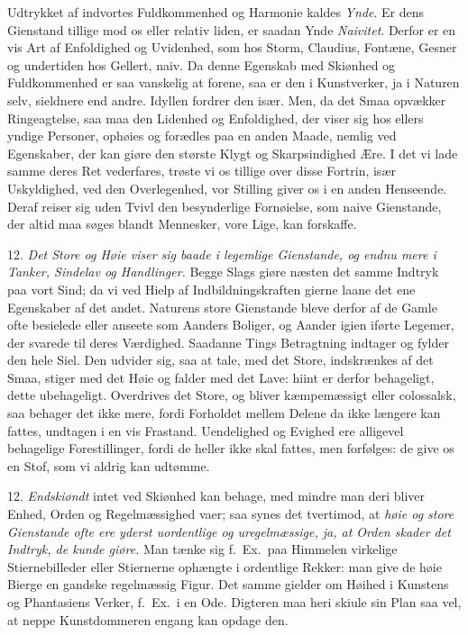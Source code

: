 \documentclass[12pt,a4paper]{article}
\newcommand{\opage}[1]{\marginnote{\footnotesize\textit{[#1]}}}
\begin{document}
Udtrykket af indvortes Fuldkommenhed og Harmonie kaldes \emph{Ynde}. Er dens Gienstand
tillige mod os eller relativ liden, er saadan Ynde \emph{Naivitet}. Derfor er en vis Art af
Enfoldighed og Uvidenhed, som hos Storm, Claudius, Fontæne, Gesner og undertiden hos
Gellert, naiv. Da denne Egenskab med Skiønhed og Fuldkommenhed er saa vanskelig at forene,
saa er den i Kunstverker, ja i Naturen selv, sieldnere end andre. Idyllen fordrer den især.
Men, da det Smaa opvækker Ringeagtelse, saa maa den Lidenhed og Enfoldighed, der viser sig
hos ellers yndige Personer, ophøies og forædles paa en anden Maade, nemlig ved Egenskaber,
der kan giøre den største Klygt og Skarpsindighed Ære. I det vi lade samme deres Ret
vederfares, trøste vi os tillige over disse Fortrin, især Uskyldighed, ved den
Overlegenhed, vor Stilling giver os i en anden Henseende. Deraf reiser sig uden Tvivl den
besynderlige Fornøielse, som naive Gienstande, der altid maa søges blandt Mennesker, vore
Lige, kan forskaffe.

12. \emph{Det Store og Høie viser sig baade i legemlige Gienstande, og endnu mere i Tanker,
Sindelav og Handlinger.} Begge Slags giøre næsten det samme Indtryk paa vort Sind; da vi
ved Hielp af Indbildningskraften gierne laane det ene Egenskaber af det
\opage{254} andet. Naturens store Gienstande bleve derfor af de Gamle ofte besielede eller anseete som
Aanders Boliger, og Aander igien iførte Legemer, der svarede til deres Værdighed. Saadanne
Tings Betragtning indtager og fylder den hele Siel. Den udvider sig, saa at tale, med det
Store, indskrænkes af det Smaa, stiger med det Høie og falder med det Lave: hiint er derfor
behageligt, dette ubehageligt. Overdrives det Store, og bliver kæmpemæssigt eller
colossalsk, saa behager det ikke mere, fordi Forholdet mellem Delene da ikke længere kan
fattes, undtagen i en vis Frastand. Uendelighed og Evighed ere alligevel behagelige
Forestillinger, fordi de heller ikke skal fattes, men forfølges: de give os en Stof, som vi
aldrig kan udtømme.

12. \emph{Endskiøndt} intet ved Skiønhed kan behage, med mindre man deri bliver Enhed,
Orden og Regelmæssighed vaer; saa synes det tvertimod, at \emph{høie og store Gienstande
ofte ere yderst uordentlige og uregelmæssige, ja, at Orden skader det Indtryk, de kunde
giøre.} Man tænke sig f.~Ex.\ paa Himmelen virkelige Stiernebilleder eller Stiernerne
ophængte i ordentlige Rekker: man give de høie Bierge en gandske regelmæssig Figur. Det
samme gielder om Høihed i Kunstens og Phantasiens Verker, f.~Ex.\ i en Ode. Digteren maa
heri skiule sin Plan saa vel, at neppe Kunstdommeren engang kan opdage den.
\end{document}
